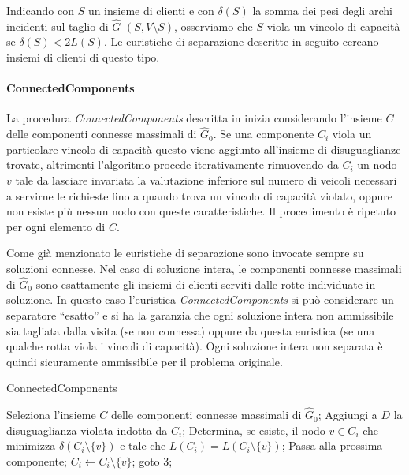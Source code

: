 \documentclass[11pt,oneside,a4paper]{article}
\begin{document}
Indicando con $S$ un insieme di clienti e con $\delta(S)$ la somma dei pesi
degli archi incidenti sul taglio di $\hat{G}$ $(S, V \setminus S)$, osserviamo che $S$ viola
un vincolo di capacità se $\delta(S) < 2L(S)$.
Le euristiche di separazione descritte in seguito cercano insiemi di clienti di questo
tipo.

\paragraph{ConnectedComponents}
La procedura \emph{ConnectedComponents} descritta in \cite{ralphs03} inizia considerando
l'insieme $C$ delle componenti connesse massimali di $\hat{G}_0$. Se una componente $C_i$ viola
un particolare vincolo di capacità questo viene aggiunto all'insieme di disuguaglianze trovate,
altrimenti l'algoritmo procede iterativamente rimuovendo da $C_i$ un nodo $v$ tale da
lasciare invariata la valutazione inferiore sul numero di veicoli necessari a servirne le
richieste fino a quando trova un vincolo di capacità violato, oppure non esiste più nessun
nodo con queste caratteristiche. Il procedimento è ripetuto per ogni elemento di $C$.

Come già menzionato le euristiche di separazione sono invocate sempre su soluzioni connesse.
Nel caso di soluzione intera, le componenti connesse massimali di $\hat{G}_0$ sono esattamente
gli insiemi di clienti serviti dalle rotte individuate in soluzione. In questo caso l'euristica
\emph{ConnectedComponents} si può considerare un separatore ``esatto'' e si ha la garanzia
che ogni soluzione intera non ammissibile sia tagliata dalla visita (se non connessa) oppure
da questa euristica (se una qualche rotta viola i vincoli di capacità). Ogni soluzione intera
non separata è quindi sicuramente ammissibile per il problema originale.

\begin{algorithm}
\caption{ConnectedComponents}

\begin{algorithmic}[1]

  \State Seleziona l'insieme $C$ delle componenti connesse massimali di $\hat{G}_0$;
      \State Aggiungi a $D$ la disuguaglianza violata indotta da $C_i$;
    \Else
      \State Determina, se esiste, il nodo $v \in C_i$ che minimizza
             $\delta(C_i \setminus \{v\})$ e tale che $L(C_i) = L(C_i \setminus \{v\})$;
        \State Passa alla prossima componente;
      \Else
        \State $C_i \gets C_i \setminus \{v\}$;
        \State goto 3;
      \EndIf
    \EndIf
  \EndFor

\end{algorithmic}
\end{algorithm}
\end{document}
